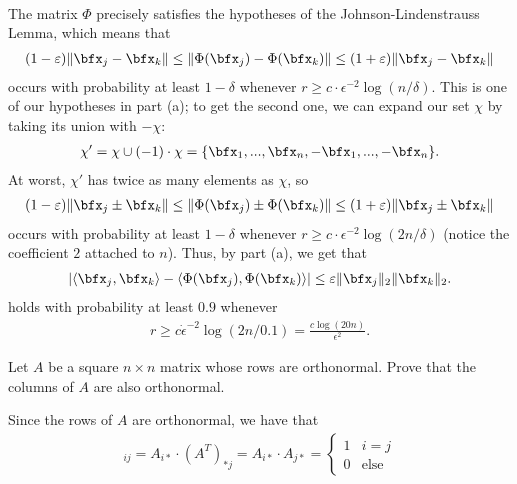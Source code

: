 \begin{homework}[e]
\begin{prf}
\begin{enumerate}[(a)]
\begin{align*}
        \end{align*}
        The matrix $\Phi$ precisely satisfies the hypotheses of the Johnson-Lindenstrauss Lemma, which means that
        \begin{align*}
          (1 - \epsilon)\|\bfx_j - \bfx_k\| \leq \|\Phi(\bfx_j) - \Phi(\bfx_k)\| \leq (1 + \epsilon)\|\bfx_j - \bfx_k\|
        \end{align*}
        occurs with probability at least $1 - \delta$ whenever $r \geq c\cdot \epsilon^{-2}\log(n/\delta)$. This is one of our hypotheses in part (a); to get the second one, we can expand our set $\chi$ by taking its union with $-\chi$:
        \begin{align*}
          \chi' = \chi \cup (-1)\cdot \chi = \{\bfx_1,...,\bfx_n,-\bfx_1,...,-\bfx_n\}.
        \end{align*}
        At worst, $\chi'$ has twice as many elements as $\chi$, so
        \begin{align*}
          (1 - \epsilon)\|\bfx_j \pm \bfx_k\| \leq \|\Phi(\bfx_j) \pm \Phi(\bfx_k)\| \leq (1 + \epsilon)\|\bfx_j \pm \bfx_k\|
        \end{align*}
        occurs with probability at least $1 - \delta$ whenever $r \geq c\cdot \epsilon^{-2}\log(2n/\delta)$ (notice the coefficient $2$ attached to $n$). Thus, by part (a), we get that  
        \begin{align*}
          |\langle \bfx_j,\bfx_k \rangle - \langle \Phi(\bfx_j),\Phi(\bfx_k) \rangle| \leq \epsilon \|\bfx_j\|_2\|\bfx_k\|_2.
        \end{align*}
        holds with probability at least $0.9$ whenever
        \begin{align*}
          r\geq c\dot \epsilon^{-2}\log(2n/0.1) = \frac{c\log(20n)}{\epsilon^2}.
        \end{align*}
    \end{enumerate}
  \end{prf}
  \prob Let $A$ be a square $n\times n$ matrix whose rows are orthonormal. Prove that the columns of $A$ are also orthonormal.
  \begin{prf}
    Since the rows of $A$ are orthonormal, we have that
    \begin{align*}
      [A\cdot A^\top]_{ij} = A_{i*}\cdot (A^T)_{*j} = A_{i*} \cdot A_{j*} =
      \begin{cases}
        1 & i = j\\
        0 & \text{else}
      \end{cases}
    \end{align*}

\end{prf}
\end{homework}
